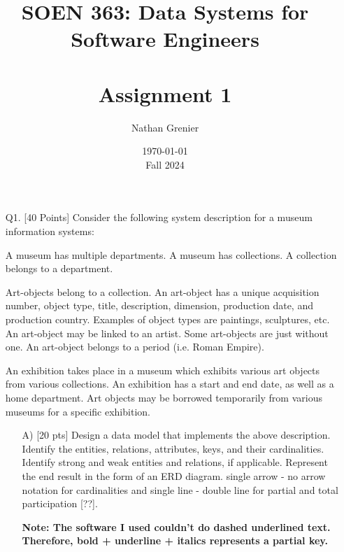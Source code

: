 \documentclass[12pt]{article}
\title{SOEN 363: Data Systems for Software Engineers\\
\ \\
Assignment 1}
\author{Nathan Grenier}
\date{\today \\ Fall 2024}
\begin{document}
\begin{spacing}{1.5}
      \maketitle

      \newpage

      \begin{enumerate}

            \item[Q1.] [40 Points] Consider the following system description for a museum information systems:

                  A museum has multiple departments. A museum has collections. A collection belongs to a department.

                  Art-objects belong to a collection. An art-object has a unique acquisition number, object type, title, description, dimension, production date, and production
                  country. Examples of object types are paintings, sculptures, etc. An art-object may be linked to an artist. Some art-objects are just without one. An art-object belongs to a period (i.e. Roman Empire).

                  An exhibition takes place in a museum which exhibits various art objects from various collections. An exhibition has a start and end date, as well as a home department. Art objects may be borrowed temporarily from various museums for a specific exhibition.

                  \begin{enumerate}

                        \item[A)] [20 pts] Design a data model that implements the above description. Identify the entities, relations, attributes, keys, and their cardinalities. Identify strong and weak entities and relations, if applicable. Represent the end result in the form of an ERD diagram. single arrow - no arrow notation for cardinalities and single line - double line for partial and total participation [??].

                              \textbf{Note: The software I used couldn't do dashed underlined text. Therefore, bold + underline + italics represents a partial key.}


\end{enumerate}
\end{enumerate}
\end{spacing}
\end{document}
